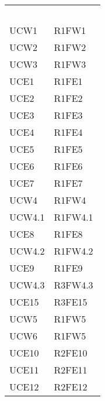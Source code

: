 \begin{table}[H]
\renewcommand{\arraystretch}{1.5}
\begin{tabular}[t]{ m{}<{\centering}  m{}<{\centering} }
	\rowcolor{darkblue}
	\textcolor{white}{\textbf{Fonte}} &\textcolor{white}{\textbf{Requisiti}}\\ 

	UCW1 & R1FW1\\	
	 
	UCW2 & R1FW2\\	

	UCW3 & R1FW3\\	
	 
	UCE1 & R1FE1\\	
	 
	UCE2 & R1FE2\\	
	 
	UCE3 & R1FE3\\	

	UCE4 & R1FE4\\	
	
	UCE5 & R1FE5\\
	 
	UCE6 & R1FE6\\	 
	 
	UCE7 & R1FE7\\	

	UCW4 & R1FW4\\ 
	 
	UCW4.1 & R1FW4.1\\	
	 
	UCE8 & R1FE8 \\	
	 
	UCW4.2 & R1FW4.2\\		 

	UCE9 & R1FE9\\		
	 
	UCW4.3 & R3FW4.3 \\				
	 
	UCE15 & R3FE15\\			
	  	 	 	
	UCW5 & R1FW5\\		
	 
	UCW6 & R1FW5 \\
	
	UCE10 & R2FE10 \\
	
	UCE11 & R2FE11\\
	 
	UCE12 & R2FE12 \\			
	 

\end{tabular}
\end{table}
